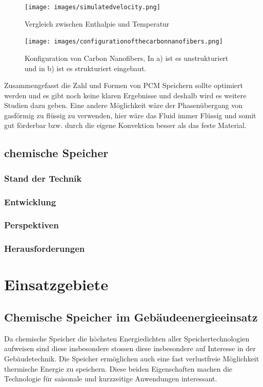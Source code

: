 \documentclass[11pt,a4paper]{scrartcl}
\begin{document}
\begin{figure}[h!]
\begin{center}
\texttt{[image: images/simulatedvelocity.png]}
\caption{Vergleich zwischen Enthalpie und Temperatur \cite{WasteEnergyHarvesting}}
\label{fig:simulatedvelocity}
\end{center}
\end{figure}

\begin{figure}[h!]
\begin{center}
\texttt{[image: images/configurationofthecarbonnanofibers.png]}
\caption{Konfiguration von Carbon Nanofibers, In a) ist es unstrukturiert und in b) ist es strukturiert eingebaut. \cite{WasteEnergyHarvesting}}
\label{fig:configurationofthecarbonnanofibers}
\end{center}
\end{figure}

Zusammengefasst die Zahl und Formen von PCM Speichern sollte optimiert werden und es gibt noch keine klaren Ergebnisse und deshalb wird es weitere Studien dazu geben.
Eine andere Möglichkeit wäre der Phasenübergang von gasförmig zu flüssig zu verwenden, hier wäre das Fluid immer Flüssig und somit gut förderbar bzw. durch die eigene Konvektion besser als das feste Material.


\subsection{chemische Speicher}
\subsubsection{Stand der Technik}
\subsubsection{Entwicklung}
\subsubsection{Perspektiven}
\subsubsection{Herausforderungen}


\newpage
\section{Einsatzgebiete}
\subsection{Chemische Speicher im Gebäudeenergieeinsatz}
Da chemische Speicher die höchsten Energiedichten aller Speichertechnologien
aufweisen sind diese insbesondere stossen diese insbesondere auf Interesse in
der Gebäudetechnik. Die Speicher ermöglichen auch eine fast verlustfreie
Möglichkeit thermische Energie zu speichern. Diese beiden Eigenschaften machen
die Technologie für saisonale und kurzzeitige Anwendungen interessant.
\end{document}

